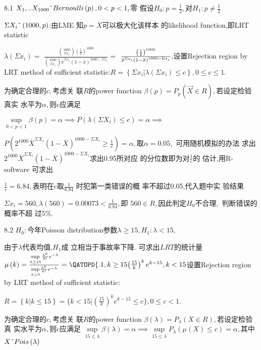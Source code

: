 \documentclass{ctexart}
\begin{document}
8.1 $X_{1},..X_{1000}\symbol{126}Bernoulli\left( p\right) ,0<p<1,$零%
假设$H_{0}:p=\frac{1}{2},$对$H_{1}:p\neq \frac{1}{2}$

$\Sigma X_{i}\symbol{126}\left( 1000,p\right) $:由LME 知$p=%
\overline{X}$可以极大化该样本%
的likelihood function,即LRT statistic

$\lambda \left( \Sigma x_{i}\right) =$ $\frac{\binom{1000}{\Sigma x_{i}}%
\left( \frac{1}{2}\right) ^{1000}}{\binom{1000}{\Sigma x_{i}}\bar{x}^{\Sigma
x_{i}}\left( 1-\bar{x}\right) ^{1000-\Sigma x_{i}}}=$ $\frac{\left( \frac{1}{%
2}\right) ^{1000}}{\bar{x}^{\Sigma x_{i}}\left( 1-\bar{x}\right)
^{1000-\Sigma x_{i}}},$设置Rejection region by LRT method of
sufficient statistic:$R=\left\{ \Sigma x_{i}|\lambda \left( \Sigma
x_{i}\right) \leq c\right\} ,0\leq c\leq 1.$

为确定合理的$c,$考虑关%
联$R$的power function $\beta \left( p\right) =P_{p}\left( \vec{X}%
\in R\right) ,$若设定检验真实%
水平为$\alpha ,$则$c$应满足

$\underset{0<p<1}{\sup }\beta \left( p\right) =\alpha \implies P\left(
\lambda \left( \Sigma X_{i}\right) \leq c\right) =\alpha \implies $

$P\left( 2^{1000}\overline{X}^{\Sigma X_{i}}\left( 1-\overline{X}\right)
^{1000-\Sigma X_{i}}\geq \frac{1}{c}\right) =\alpha ,$取$\alpha =0.05,$%
可用随机模拟的办法%
求出$2^{1000}\overline{X}^{\Sigma X_{i}}\left( 1-\overline{X}%
\right) ^{1000-\Sigma X_{i}}$求出0.95所对应%
的分位数即为对$\frac{1}{c}$的%
估计,用R-software 可求出

$\frac{1}{c}=6.84,$表明在$c$取$\frac{1}{6.84}$%
时犯第一类错误的概%
率不超过0.05,代入题中实%
验结果

$\Sigma x_{i}=560,\lambda \left( 560\right) =0.00073<\frac{1}{6.84},$即%
$560\in R,$因此判定$H_{0}$不合理$,$%
判断错误的概率不超%
过$5\%.$

8.2 $H_{0}:$今年Poisson distribution参数$\lambda
\geq 15,H_{1}:\lambda <15,$

由于$\lambda $代表均值,$H_{1}$成%
立相当于事故率下降. 
可求出$LRT$的统计量$\mu \left(
k\right) =\frac{\underset{\lambda \geq 15}{\sup }\frac{\lambda ^{k}}{k!}%
e^{-\lambda }}{\underset{\lambda >0}{\sup }\frac{\lambda ^{k}}{k!}%
e^{-\lambda }}=\QATOPD\{ . {1,k\geq 15}{\left( \frac{15}{k}\right)
^{k}e^{k-15},k<15}$设置Rejection region by LRT method of
sufficient statistic:

$R=\left\{ k|k\leq 15\right\} =\{k<15|\left( \frac{15}{k}\right)
^{k}e^{k-15}\leq c\},0\leq c<1.$

为确定合理的$c,$考虑关%
联$R$的power function $\beta \left( \lambda \right) =P_{\lambda
}\left( X\in R\right) ,$若设定检验真%
实水平为$\alpha ,$则$c$应满足%
$\underset{15\leq \lambda }{\sup }\beta \left( \lambda \right) =\alpha
\implies \underset{15\leq \lambda }{\sup }P_{\lambda }\left( \mu \left(
X\right) \leq c\right) =\alpha ,$其中$X\symbol{126}Pois\left(
\lambda \right) $
\end{document}
